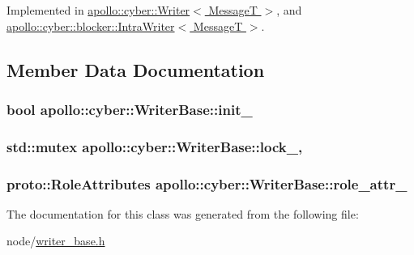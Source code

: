 Implemented in \hyperlink{classapollo_1_1cyber_1_1Writer_a915a8e6c0bb86a98f4ab09d41a9d3242}{apollo\-::cyber\-::\-Writer$<$ Message\-T $>$}, and \hyperlink{classapollo_1_1cyber_1_1blocker_1_1IntraWriter_a61e18b7c53d860a2f141b057177d33a0}{apollo\-::cyber\-::blocker\-::\-Intra\-Writer$<$ Message\-T $>$}.



\subsection{Member Data Documentation}
\hypertarget{classapollo_1_1cyber_1_1WriterBase_a4fc901907b73dc78d2f30f12d962b3c8}{
\subsubsection[{init\-\_\-}]{\setlength{\rightskip}{0pt plus 5cm}bool apollo\-::cyber\-::\-Writer\-Base\-::init\-\_\-\hspace{0.3cm}{\ttfamily [protected]}}}\label{classapollo_1_1cyber_1_1WriterBase_a4fc901907b73dc78d2f30f12d962b3c8}
\hypertarget{classapollo_1_1cyber_1_1WriterBase_aee167e7d2135c520e2e635b545449acb}{
\subsubsection[{lock\-\_\-}]{\setlength{\rightskip}{0pt plus 5cm}std\-::mutex apollo\-::cyber\-::\-Writer\-Base\-::lock\-\_\-\hspace{0.3cm}{\ttfamily [mutable]}, {\ttfamily [protected]}}}\label{classapollo_1_1cyber_1_1WriterBase_aee167e7d2135c520e2e635b545449acb}
\hypertarget{classapollo_1_1cyber_1_1WriterBase_aa6fa91676f28b3010a849b7eecb18b76}{
\subsubsection[{role\-\_\-attr\-\_\-}]{\setlength{\rightskip}{0pt plus 5cm}proto\-::\-Role\-Attributes apollo\-::cyber\-::\-Writer\-Base\-::role\-\_\-attr\-\_\-\hspace{0.3cm}{\ttfamily [protected]}}}\label{classapollo_1_1cyber_1_1WriterBase_aa6fa91676f28b3010a849b7eecb18b76}


The documentation for this class was generated from the following file\-:\begin{DoxyCompactItemize}
\item 
node/\hyperlink{writer__base_8h}{writer\-\_\-base.\-h}\end{DoxyCompactItemize}
